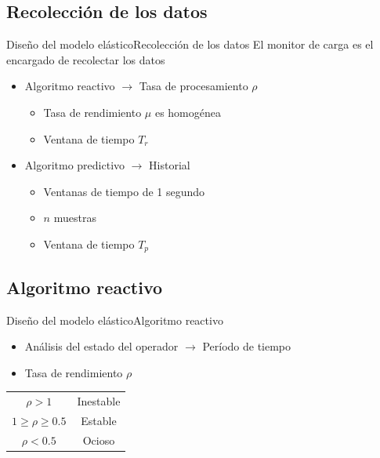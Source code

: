 \subsection*{Recolección de los datos}
\begin{frame}{Diseño del modelo elástico}{Recolección de los datos}
El monitor de carga es el encargado de recolectar los datos
\begin{itemize}
	\item Algoritmo reactivo $\rightarrow$ Tasa de procesamiento $\rho$
	\begin{itemize}
		\item Tasa de rendimiento $\mu$ es homogénea
		\item Ventana de tiempo $T_r$
	\end{itemize}
	\item Algoritmo predictivo $\rightarrow$ Historial
	\begin{itemize}
		\item Ventanas de tiempo de 1 segundo
		\item $n$ muestras
		\item Ventana de tiempo $T_p$
	\end{itemize}
\end{itemize}

\end{frame}

\subsection*{Algoritmo reactivo}
\begin{frame}{Diseño del modelo elástico}{Algoritmo reactivo}
\begin{itemize}
\item Análisis del estado del operador $\rightarrow$ Período de tiempo
\item Tasa de rendimiento $\rho$
\end{itemize}
\hspace{1cm}
\begin{tabular}{c c}
	$\rho > 1$ & Inestable \\
	$1 \geqslant \rho \geqslant 0.5$ & Estable \\
	$\rho < 0.5$ & Ocioso
\end{tabular}
\end{frame}

